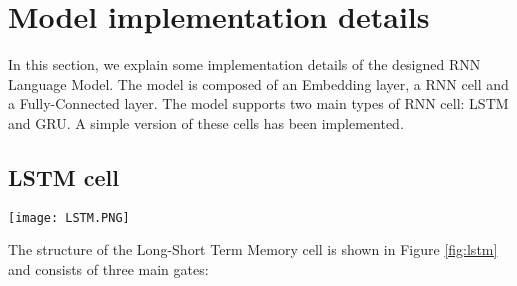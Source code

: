 
\section{Model implementation details}

In this section, we explain some implementation details of the designed 
RNN Language Model. The model is composed of an Embedding layer, a RNN cell 
and a Fully-Connected layer. The model supports two main types of RNN cell: 
LSTM and GRU. A simple version of these cells has been implemented.

\subsection{LSTM cell}

\begin{figure*}[htbp]
\centerline{\texttt{[image: LSTM.PNG]}}
\caption{Long-Short Term Memory cell structure and related equations.} %
\label{fig:lstm}
\end{figure*}

The structure of the Long-Short Term Memory cell is shown in Figure \ref{fig:lstm}
and consists of three main gates:

